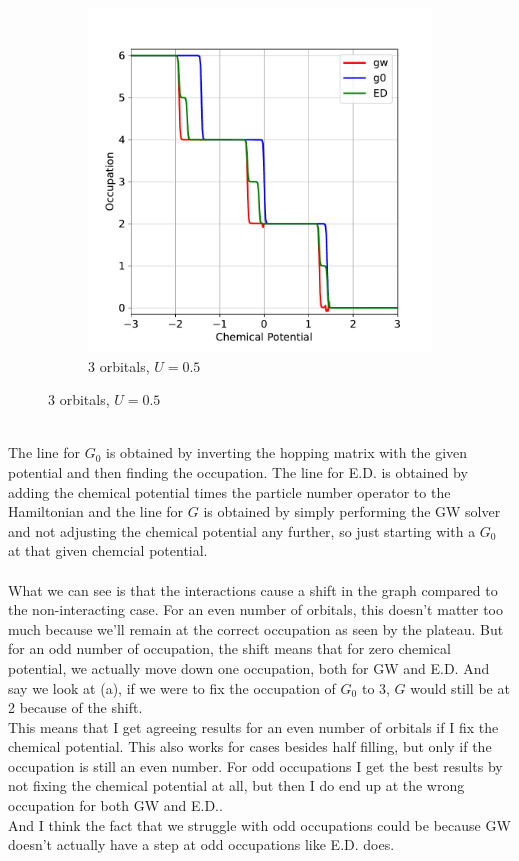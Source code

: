 \documentclass[12pt]{article}
\begin{document}
\begin{figure}[h!]
\begin{subfigure}[b]{0.45\textwidth}
    \includegraphics[width=\textwidth]{o3.pdf}
    \caption{3 orbitals, $U=0.5$}
  \end{subfigure}
\end{figure}\\
The line for $G_0$ is obtained by inverting the hopping matrix with the given potential and then finding the occupation. The line for E.D. is obtained by adding the chemical potential times the particle number operator to the Hamiltonian and the line for $G$ is obtained by simply performing the GW solver and not adjusting the chemical potential any further, so just starting with a $G_0$ at that given chemcial potential.\\
\\
What we can see is that the interactions cause a shift in the graph compared to the non-interacting case. For an even number of orbitals, this doesn't matter too much because we'll remain at the correct occupation as seen by the plateau. But for an odd number of occupation, the shift means that for zero chemical potential, we actually move down one occupation, both for GW and E.D. And say we look at (a), if we were to fix the occupation of $G_0$ to 3, $G$ would still be at 2 because of the shift.\\
This means that I get agreeing results for an even number of orbitals if I fix the chemical potential. This also works for cases besides half filling, but only if the occupation is still an even number. For odd occupations I get the best results by not fixing the chemical potential at all, but then I do end up at the wrong occupation for both GW and E.D..\\
And I think the fact that we struggle with odd occupations could be because GW doesn't actually have a step at odd occupations like E.D. does.
\end{document}
